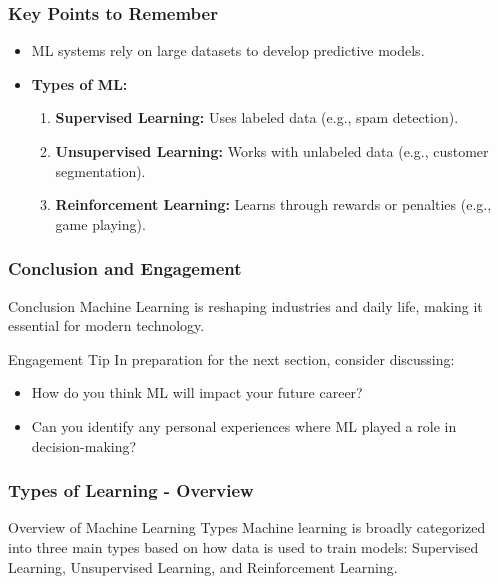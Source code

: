 \documentclass[aspectratio=169]{beamer}
\begin{document}
\begin{frame}[fragile]
    \frametitle{Key Points to Remember}
    \begin{itemize}
        \item ML systems rely on large datasets to develop predictive models.
        \item \textbf{Types of ML:}
        \begin{enumerate}
            \item \textbf{Supervised Learning:} Uses labeled data (e.g., spam detection).
            \item \textbf{Unsupervised Learning:} Works with unlabeled data (e.g., customer segmentation).
            \item \textbf{Reinforcement Learning:} Learns through rewards or penalties (e.g., game playing).
        \end{enumerate}
    \end{itemize}
\end{frame}

\begin{frame}[fragile]
    \frametitle{Conclusion and Engagement}
    \begin{block}{Conclusion}
        Machine Learning is reshaping industries and daily life, making it essential for modern technology.
    \end{block}
    \begin{block}{Engagement Tip}
        In preparation for the next section, consider discussing:
        \begin{itemize}
            \item How do you think ML will impact your future career?
            \item Can you identify any personal experiences where ML played a role in decision-making?
        \end{itemize}
    \end{block}
\end{frame}

\begin{frame}[fragile]
    \frametitle{Types of Learning - Overview}
    \begin{block}{Overview of Machine Learning Types}
        Machine learning is broadly categorized into three main types based on how data is used to train models:
        Supervised Learning, Unsupervised Learning, and Reinforcement Learning.
    \end{block}
\end{frame}
\end{document}
